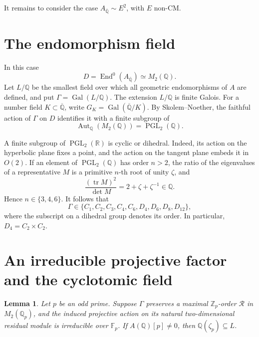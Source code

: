 \documentclass[11pt]{article}
\newtheorem{lemma}{Lemma}
\newcommand{\Q}{\mathbb Q}
\newcommand{\Z}{\mathbb Z}
\newcommand{\F}{\mathbb F}
\DeclareMathOperator{\End}{End}
\DeclareMathOperator{\Gal}{Gal}
\DeclareMathOperator{\PGL}{PGL}
\begin{document}
It remains to consider the case
\(A_{\overline{\Q}}\sim E^2\), with \(E\) non-CM.

\section{The endomorphism field}

In this case
\[
 D=\End^0(A_{\overline{\Q}})\simeq M_2(\Q).
\]
Let \(L/\Q\) be the smallest field over which all geometric
endomorphisms of \(A\) are defined, and put
\(\Gamma=\Gal(L/\Q)\). The extension \(L/\Q\) is finite Galois.
For a number field \(K\subset\overline{\Q}\), write
\(G_K=\Gal(\overline{\Q}/K)\).
By Skolem--Noether, the faithful action of \(\Gamma\) on \(D\)
identifies it with a finite subgroup of
\[
 \operatorname{Aut}_{\Q}(M_2(\Q))=\PGL_2(\Q).
\]

A finite subgroup of \(\PGL_2(\mathbb R)\) is cyclic or dihedral.
Indeed, its action on the hyperbolic plane fixes a point, and the
action on the tangent plane embeds it in \(O(2)\). If an element
of \(\PGL_2(\Q)\) has order \(n>2\), the ratio of the eigenvalues
of a representative \(M\) is a primitive \(n\)-th root of unity
\(\zeta\), and
\[
 \frac{(\operatorname{tr}M)^2}{\det M}
 =2+\zeta+\zeta^{-1}\in\Q.
\]
Hence \(n\in\{3,4,6\}\). It follows that
\[
 \Gamma\in\{C_1,C_2,C_3,C_4,C_6,D_4,D_6,D_8,D_{12}\},
\]
where the subscript on a dihedral group denotes its order.
In particular, \(D_4=C_2\times C_2\).

\section{An irreducible projective factor and the cyclotomic field}

\begin{lemma}\label{lem:cyclotomic}
Let \(p\) be an odd prime. Suppose \(\Gamma\) preserves a maximal
\(\Z_p\)-order \(\mathcal R\) in \(M_2(\Q_p)\), and the induced
projective action on its natural two-dimensional residual module
is irreducible over \(\F_p\). If \(A(\Q)[p]\neq0\), then
\(\Q(\zeta_p)\subseteq L\).
\end{lemma}
\end{document}
